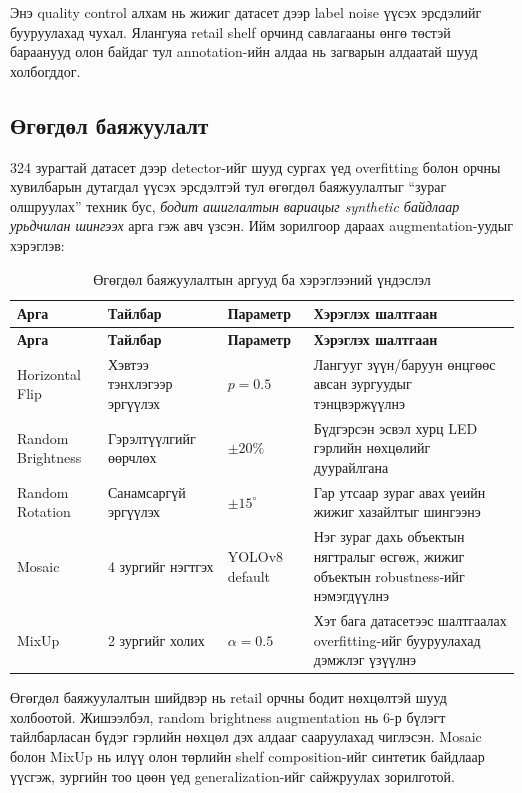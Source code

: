 Энэ quality control алхам нь жижиг датасет дээр label noise үүсэх эрсдэлийг бууруулахад чухал. Ялангуяа retail shelf орчинд савлагааны өнгө төстэй бараанууд олон байдаг тул annotation-ийн алдаа нь загварын алдаатай шууд холбогддог.

\subsection{Өгөгдөл баяжуулалт}

324 зурагтай датасет дээр detector-ийг шууд сургах үед overfitting болон орчны хувилбарын дутагдал үүсэх эрсдэлтэй тул өгөгдөл баяжуулалтыг ``зураг олшруулах'' техник бус, \textit{бодит ашиглалтын вариацыг synthetic байдлаар урьдчилан шингээх} арга гэж авч үзсэн. Ийм зорилгоор дараах augmentation-уудыг хэрэглэв:

\begin{longtable}{|p{3.2cm}|p{4.6cm}|p{2cm}|p{3.2cm}|}
\caption{Өгөгдөл баяжуулалтын аргууд ба хэрэглээний үндэслэл}
\label{tab:augmentation} \\
\hline
\textbf{Арга} & \textbf{Тайлбар} & \textbf{Параметр} & \textbf{Хэрэглэх шалтгаан} \\
\hline
\endfirsthead
\hline
\textbf{Арга} & \textbf{Тайлбар} & \textbf{Параметр} & \textbf{Хэрэглэх шалтгаан} \\
\hline
\endhead
\hline
\endfoot
Horizontal Flip & Хэвтээ тэнхлэгээр эргүүлэх & $p=0.5$ & Лангууг зүүн/баруун өнцгөөс авсан зургуудыг тэнцвэржүүлнэ \\
\hline
Random Brightness & Гэрэлтүүлгийг өөрчлөх & $\pm 20\%$ & Бүдгэрсэн эсвэл хурц LED гэрлийн нөхцөлийг дуурайлгана \\
\hline
Random Rotation & Санамсаргүй эргүүлэх & $\pm 15^\circ$ & Гар утсаар зураг авах үеийн жижиг хазайлтыг шингээнэ \\
\hline
Mosaic & 4 зургийг нэгтгэх & YOLOv8 default & Нэг зураг дахь объектын нягтралыг өсгөж, жижиг объектын robustness-ийг нэмэгдүүлнэ \\
\hline
MixUp & 2 зургийг холих & $\alpha=0.5$ & Хэт бага датасетээс шалтгаалах overfitting-ийг бууруулахад дэмжлэг үзүүлнэ \\
\hline
\end{longtable}

Өгөгдөл баяжуулалтын шийдвэр нь retail орчны бодит нөхцөлтэй шууд холбоотой. Жишээлбэл, random brightness augmentation нь 6-р бүлэгт тайлбарласан бүдэг гэрлийн нөхцөл дэх алдааг сааруулахад чиглэсэн. Mosaic болон MixUp нь илүү олон төрлийн shelf composition-ийг синтетик байдлаар үүсгэж, зургийн тоо цөөн үед generalization-ийг сайжруулах зорилготой.

